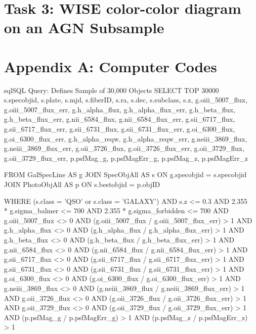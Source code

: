\documentclass[letterpaper, oneside]{article}
\begin{document}
\section*{Task 3: WISE color-color diagram on an AGN Subsample}





\pagebreak

\appendix

\section*{Appendix A: Computer Codes}

\begin{sourcecode}[\label{sdss_query}]{sql}{SQL Query: Defines Sample of 30,000 Objects}
SELECT TOP 30000 s.specobjid, s.plate, s.mjd, s.fiberID, 
s.ra, s.dec, s.subclass, s.z, 
g.oiii_5007_flux, g.oiii_5007_flux_err, 
g.h_alpha_flux, g.h_alpha_flux_err, 
g.h_beta_flux, g.h_beta_flux_err, 
g.nii_6584_flux, g.nii_6584_flux_err, 
g.sii_6717_flux, g.sii_6717_flux_err, 
g.sii_6731_flux, g.sii_6731_flux_err, 
g.oi_6300_flux, g.oi_6300_flux_err, 
g.h_alpha_reqw, g.h_alpha_reqw_err, 
g.neiii_3869_flux, g.neiii_3869_flux_err, 
g.oii_3726_flux, g.oii_3726_flux_err, 
g.oii_3729_flux, g.oii_3729_flux_err, 
p.psfMag_g, p.psfMagErr_g, 
p.psfMag_z, p.psfMagErr_z

FROM GalSpecLine AS g 
JOIN SpecObjAll AS s ON g.specobjid = s.specobjid
JOIN PhotoObjAll AS p ON s.bestobjid = p.objID

WHERE
(s.class = 'QSO' or s.class = 'GALAXY')
AND s.z <= 0.3
AND 2.355 * g.sigma_balmer <= 700
AND 2.355 * g.sigma_forbidden <= 700
AND g.oiii_5007_flux <> 0
AND (g.oiii_5007_flux / g.oiii_5007_flux_err) > 1
AND g.h_alpha_flux <> 0
AND (g.h_alpha_flux / g.h_alpha_flux_err) > 1
AND g.h_beta_flux <> 0
AND (g.h_beta_flux / g.h_beta_flux_err) > 1
AND g.nii_6584_flux <> 0
AND (g.nii_6584_flux / g.nii_6584_flux_err) > 1
AND g.sii_6717_flux <> 0
AND (g.sii_6717_flux / g.sii_6717_flux_err) > 1
AND g.sii_6731_flux <> 0
AND (g.sii_6731_flux / g.sii_6731_flux_err) > 1
AND g.oi_6300_flux <> 0
AND (g.oi_6300_flux / g.oi_6300_flux_err) > 1
AND g.neiii_3869_flux <> 0
AND (g.neiii_3869_flux / g.neiii_3869_flux_err) > 1
AND g.oii_3726_flux <> 0
AND (g.oii_3726_flux / g.oii_3726_flux_err) > 1
AND g.oii_3729_flux <> 0
AND (g.oii_3729_flux / g.oii_3729_flux_err) > 1
AND (p.psfMag_g / p.psfMagErr_g) > 1
AND (p.psfMag_z / p.psfMagErr_z) > 1
\end{sourcecode}
\end{document}
